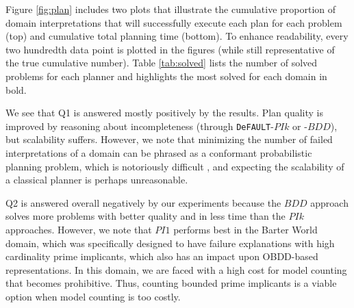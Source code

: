 \documentclass{article}
\def\citep#1{\cite{#1}}
\def\und#1{\noindent{\bf #1}:}
\def\FFRISKY{{\tt DeFAULT}}
\def\und#1{\medskip{\noindent\bf #1:}}
\begin{document}
\und{Off-line Planning Results} Figure \ref{fig:plan} includes two plots that illustrate the cumulative proportion of domain interpretations that will successfully execute each plan for each problem (top) and cumulative total planning time (bottom).  To enhance readability, every two hundredth data point is plotted in the figures (while still representative of the true cumulative number).  Table \ref{tab:solved} lists the number of solved problems for each planner and highlights the most solved for each domain in bold.  

We see that Q1 is answered mostly positively by the results.  Plan quality is improved by reasoning about incompleteness (through \FFRISKY{}-$PIk$ or -$BDD$), but scalability suffers.  However, we note that minimizing the number of failed interpretations of a domain can be phrased as a conformant probabilistic planning problem, which is notoriously difficult \citep{pff,aij-mclug}, and expecting the scalability of a classical planner is perhaps unreasonable.  

Q2 is answered overall negatively by our experiments because the $BDD$ approach solves more problems with better quality and in less time than the $PIk$ approaches.  However, we note that $PI1$ performs best in the Barter World domain, which was specifically designed to have failure explanations with high cardinality prime implicants, which also has an impact upon OBDD-based representations.  In this domain, we are faced with a high cost for model counting that becomes prohibitive.  Thus, counting bounded prime implicants is a viable option when model counting is too costly.
\end{document}
